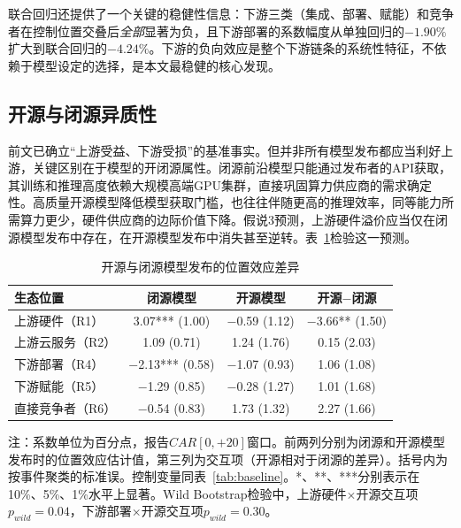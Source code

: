 \documentclass[11pt,fontset=fandol,a4paper]{ctexart}
\newcommand{\changed}[1]{#1}
\begin{document}
联合回归还提供了一个关键的稳健性信息：下游三类（集成、部署、赋能）和竞争者在控制位置交叠后\emph{全部}显著为负，且下游部署的系数幅度从单独回归的$-1.90\%$扩大到联合回归的$-4.24\%$。下游的负向效应是整个下游链条的系统性特征，不依赖于模型设定的选择，是本文最稳健的核心发现。

\subsection{开源与闭源异质性}\label{sec:openclose}

\changed{前文已确立“上游受益、下游受损”的基准事实。但并非所有模型发布都应当利好上游，关键区别在于模型的开闭源属性。闭源前沿模型只能通过发布者的API获取，其训练和推理高度依赖大规模高端GPU集群，直接巩固算力供应商的需求确定性。高质量开源模型降低模型获取门槛，也往往伴随更高的推理效率，同等能力所需算力更少，硬件供应商的边际价值下降。假说3预测，上游硬件溢价应当仅在闭源模型发布中存在，在开源模型发布中消失甚至逆转。表~\ref{tab:openclose}检验这一预测。}

\begin{table}[H]
\centering
\small
\begin{threeparttable}
\caption{开源与闭源模型发布的位置效应差异}
\label{tab:openclose}
\begin{tabular}{lccc}
\toprule
生态位置 & 闭源模型 & 开源模型 & 开源$-$闭源 \\
\midrule
上游硬件（R1） & 3.07*** (1.00) & $-$0.59 (1.12) & $-$3.66** (1.50) \\[3pt]
上游云服务（R2） & 1.09 (0.71) & 1.24 (1.76) & 0.15 (2.03) \\[3pt]
下游部署（R4） & $-$2.13*** (0.58) & $-$1.07 (0.93) & 1.06 (1.08) \\[3pt]
下游赋能（R5） & $-$1.29 (0.85) & $-$0.28 (1.27) & 1.01 (1.68) \\[3pt]
直接竞争者（R6） & $-$0.54 (0.83) & 1.73 (1.32) & 2.27 (1.66) \\
\bottomrule
\end{tabular}
\begin{tablenotes}
\footnotesize
\item 注：系数单位为百分点，报告$CAR[0,+20]$窗口。前两列分别为闭源和开源模型发布时的位置效应估计值，第三列为交互项（开源相对于闭源的差异）。括号内为按事件聚类的标准误。控制变量同表~\ref{tab:baseline}。*、**、***分别表示在10\%、5\%、1\%水平上显著。Wild Bootstrap检验中，上游硬件$\times$开源交互项$p_{wild}=0.04$，下游部署$\times$开源交互项$p_{wild}=0.30$。
\end{tablenotes}
\end{threeparttable}
\end{table}
\end{document}
